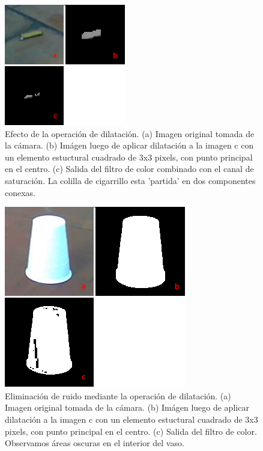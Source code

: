 \begin{figure}[tpb]
\begin{center}
  \includegraphics[scale=0.8]{figuras/dilate1.png}
\end{center}
  \caption{\small Efecto de la operación de dilatación. (a)  Imagen original tomada de la cámara. (b) Imágen luego de aplicar dilatación a la imagen c con un elemento estuctural cuadrado de 3x3 pixels, con punto principal en el centro. (c) Salida del filtro de color combinado con el canal de saturación. La colilla de cigarrillo esta 'partida' en dos componentes conexas. } 
  \label{fig:dilate}
\end{figure}

\begin{figure}[tpb]
\begin{center}

  \includegraphics[scale=0.6]{figuras/dilate-ruido.png}
\end{center}
  \caption{\small Eliminación de ruido mediante la operación de dilatación. (a) Imagen original tomada de la cámara. (b) Imágen luego de aplicar dilatación a la imagen c con un elemento estuctural cuadrado de 3x3 pixels, con punto principal en el centro. (c) Salida del filtro de color. Observamos áreas  oscuras en el interior del vaso. }
  \label{fig:dilate-ruido}
\end{figure}

